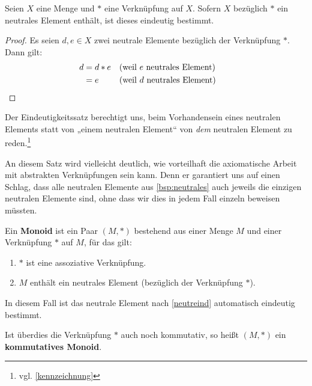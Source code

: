 \begin{satz} \label{neutreind}
    Seien $X$ eine Menge und $*$ eine Verknüpfung auf $X$. Sofern $X$ bezüglich $*$ ein neutrales Element enthält, ist dieses eindeutig bestimmt.
\end{satz}
\begin{proof}
    Es seien $d,e\in X$ zwei neutrale Elemente bezüglich der Verknüpfung $*$. Dann gilt:
    \begin{align*}
        d & = d*e && (\text{weil $e$ neutrales Element}) \\
        & = e && (\text{weil $d$ neutrales Element}) && \qedhere
    \end{align*}
\end{proof}


\begin{bem}
    Der Eindeutigkeitssatz berechtigt uns, beim Vorhandensein eines neutralen Elements statt von „einem neutralen Element“ von \emph{dem} neutralen Element zu reden.\footnote{vgl. \cref{kennzeichnung}}
    
    An diesem Satz wird vielleicht deutlich, wie vorteilhaft die axiomatische Arbeit mit abstrakten Verknüpfungen sein kann. Denn er garantiert uns auf einen Schlag, dass alle neutralen Elemente aus \cref{bsp:neutrales} auch jeweils die einzigen neutralen Elemente sind, ohne dass wir dies in jedem Fall einzeln beweisen müssten.
\end{bem}


\begin{defin}[Monoid] 
    Ein \textbf{Monoid} ist ein Paar $(M,*)$ bestehend aus einer Menge $M$ und einer Verknüpfung $*$ auf $M$, für das gilt:
    \begin{enumerate}[(M1), labelindent=1.5em, leftmargin=*]
        \item $*$ ist eine assoziative Verknüpfung.
        \item $M$ enthält ein neutrales Element (bezüglich der Verknüpfung $*$).
    \end{enumerate}
    In diesem Fall ist das neutrale Element nach \cref{neutreind} automatisch eindeutig bestimmt.
    
    Ist überdies die Verknüpfung $*$ auch noch kommutativ, so heißt $(M,*)$ ein \textbf{kommutatives Monoid}.
\end{defin}


